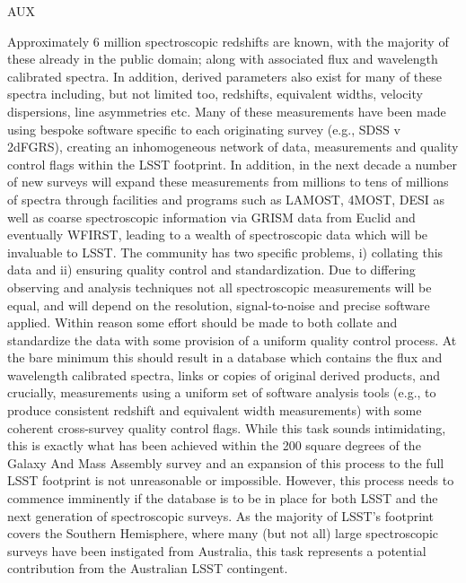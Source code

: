 {\begin{tasklist}{AUX}
\begin{task}
{\begin{enumerate}
\end{enumerate}
Approximately 6 million spectroscopic redshifts are known, with the majority of these already in the public domain; along with associated flux and wavelength calibrated spectra. In addition, derived parameters also exist for many of these spectra including, but not limited too, redshifts, equivalent widths, velocity dispersions, line asymmetries etc. Many of these measurements have been made using bespoke software specific to each originating survey (e.g., SDSS v 2dFGRS), creating an inhomogeneous network of data, measurements and quality control flags within the LSST footprint.
In addition, in the next decade a number of new surveys will expand these measurements from millions to tens of millions of spectra through facilities and programs such as LAMOST, 4MOST, DESI as well as coarse spectroscopic information via GRISM data from Euclid and eventually WFIRST, leading to a wealth of spectroscopic data which will be invaluable to LSST.
The community has two specific problems, i) collating this data and ii) ensuring quality control and standardization. Due to differing observing and analysis techniques not all spectroscopic measurements will be equal, and will depend on the resolution, signal-to-noise and precise software applied.
Within reason some effort should be made to both collate and standardize the data with some provision of a uniform quality control process. At the bare minimum this should result in a database which contains the flux and wavelength calibrated spectra, links or copies of original derived products, and crucially, measurements using a uniform set of software analysis tools (e.g., to produce consistent redshift and equivalent width measurements) with some coherent cross-survey quality control flags.
While this task sounds intimidating, this is exactly what has been achieved within the 200 square degrees of the Galaxy And Mass Assembly survey \citep{driver2011a,driver2016a,liske2015a} and an expansion of this process to the full LSST footprint is not unreasonable or impossible. However, this process needs to commence imminently if the database is to be in place for both LSST and the next generation of spectroscopic surveys.
As the majority of LSST's footprint covers the Southern Hemisphere, where many (but not all) large spectroscopic surveys have been instigated from Australia, this task represents a potential contribution from the Australian LSST contingent.
}
~\\
\end{task}




\end{tasklist}}
